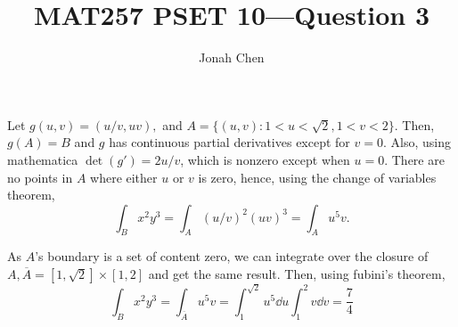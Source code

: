 \documentclass{exam}
\title{MAT257 PSET 10---Question 3}
\author{Jonah Chen}
\date{}
\numberwithin{equation}{section}
\begin{document}
    \sffamily
    \maketitle
    Let \(g(u,v)=(u/v,uv),\) and \(A=\{(u,v):1<u<\sqrt2,1<v<2\}.\) Then, \(g(A)=B\) and \(g\) has continuous partial derivatives except for \(v=0.\) Also, using mathematica \(\det(g')=2u/v\), which is nonzero except when \(u=0\). There are no points in \(A\) where either \(u\) or \(v\) is zero, hence, using the change of variables theorem,
    \[\int_Bx^2y^3=\int_A(u/v)^2(uv)^3=\int_Au^5v.\]

    As \(A\)'s boundary is a set of content zero, we can integrate over the closure of \(A,\overline A=[1,\sqrt2]\times[1,2]\) and get the same result. Then, using fubini's theorem,
    \[\int_Bx^2y^3=\int_{\overline A}u^5v=\int_1^{\sqrt2}u^5\dd u\int_1^{2}v\dd v=\frac{7}{4}\]
\end{document}

